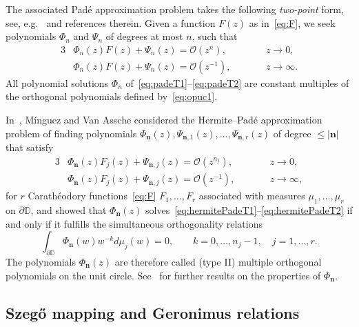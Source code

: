 \documentclass[reqno,centertags,11pt,draft]{amsart}
\newcommand{\T}{\mathbb{\partial\mathbb{D}}}
\begin{document}
The associated Pad\'{e} approximation problem takes the following {\it two-point} form, see, e.g.~\cite{Baker,Bultheel,JNT,PeherstorferSteinbauer} and references therein.
Given a function $F(z)$ as in~\eqref{eq:F}, we seek polynomials $\Phi_n$ and $\Psi_n$ of degrees at most $n$, such that
\begin{alignat}{3}
\label{eq:padeT1}
    & \Phi_{{n}}(z)F(z) + \Psi_{{n}}(z) = \mathcal{O}(z^{n}),  \qquad&& z \rightarrow 0, 
    \\
    \label{eq:padeT2}
    & \Phi_{{n}}(z)F(z) + \Psi_{{n}}(z) = \mathcal{O}(z^{-1}), \qquad && z \rightarrow \infty.
\end{alignat}
All polynomial solutions $\Phi_n$ of~\eqref{eq:padeT1}--\eqref{eq:padeT2} %
are constant multiples of the orthogonal polynomials defined by~\eqref{eq:opuc1}.

In~\cite{MOPUC1}, M\'{i}nguez and Van Assche considered the Hermite--Pad\'{e} approximation problem of finding 
polynomials $\Phi_{\bm{n}}(z),\Psi_{\bm{n},1}(z),\ldots,\Psi_{\bm{n},r}(z)$ of degree $\le|\bm{n}|$ that satisfy
\begin{alignat}{3}
    \label{eq:hermitePadeT1}
    & \Phi_{\bm{n}}(z)F_j(z) + \Psi_{\bm{n},j}(z) = \mathcal{O}(z^{n_j}), \qquad  && z \rightarrow 0, 
    \\
    \label{eq:hermitePadeT2}
    & \Phi_{\bm{n}}(z)F_j(z) + \Psi_{\bm{n},j}(z) = \mathcal{O}(z^{-1}), \qquad  &&z \rightarrow \infty,
\end{alignat}
for $r$ Carath\'{e}odory functions~\eqref{eq:F} $F_1,\ldots,F_r$ associated with measures $\mu_1,\ldots,\mu_r$  on $\T$, and showed that $\Phi_{\bm{n}}(z)$ %
solves~\eqref{eq:hermitePadeT1}--\eqref{eq:hermitePadeT2} if and only if it
fulfills the simultaneous orthogonality relations
\begin{equation}\label{eq:MOPUC}
    \int_\T \Phi_{\bm{n}}(w) w^{-k}  d\mu_j(w) = 0,
    \qquad k = 0,\ldots,n_j-1, \quad j = 1,\ldots,r.
\end{equation}
The polynomials $\Phi_{\bm{n}}(z)$ are therefore  called (type II) multiple orthogonal polynomials on the unit circle. See~\cites{MOPUC1,MOPUC2,KVMOPUC} for further results on the properties of $\Phi_{\bm{n}}$. %

\subsection{Szeg\H{o} mapping and Geronimus relations}\label{ss:intro3}
\hfill\\
\end{document}
